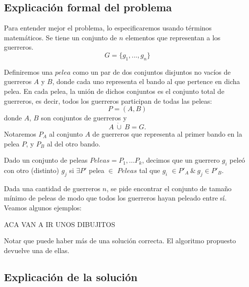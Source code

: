 
\subsection{Explicación formal del problema}

\par Para entender mejor el problema, lo especificaremos usando términos matemáticos. Se tiene un conjunto de $n$ elementos que representan a los guerreros. 
\[G = \{g_1,...,g_n\}\]
\par Definiremos una $pelea$ como un par de dos conjuntos disjuntos no vacíos de guerreros $A$ y $B$, donde cada uno representa el bando al que pertence en dicha pelea. En cada pelea, la unión de dichos conjuntos es el conjunto total de guerreros, es decir, todos los guerreros participan de todas las peleas:
\[ P = (A, B)\]
donde $A$, $B$ son conjuntos de guerreros y  \[A \ \dot{\cup}\ B = G.\]
Notaremos $P_A$ al conjunto $A$ de guerreros que representa al primer bando en la pelea $P$, y $P_B$ al del otro bando.
\par Dado un conjunto de peleas $Peleas = P_1,...P_k$, decimos que un guerrero $g_i$ peleó con otro (distinto) $g_j$ si $\exists P'$ pelea $\in$ $Peleas$ tal que $g_i$ $\in P'_A \ \& \ g_j \in P'_B$. 
\par Dada una cantidad de guerreros $n$, se pide encontrar el conjunto de tamaño mínimo de peleas de modo que todos los guerreros hayan peleado entre sí. Veamos algunos ejemplos:

ACA VAN A IR UNOS DIBUJITOS

%

\par Notar que puede haber más de una solución correcta. El algoritmo propuesto devuelve una de ellas.

\subsection{Explicación de la solución}

